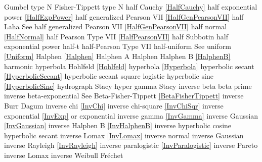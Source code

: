 Gumbel type N 					\dotfill	Fisher-Tippett type N 				\ncite	%
%
half Cauchy					\dotfill	\eqref{HalfCauchy}					\ncite	%
half exponential power			\dotfill	\eqref{HalfExpPower}				\ncite	%
half generalized Pearson VII		\dotfill	\eqref{HalfGenPearsonVII}			\ncite	%
half Laha						\dotfill	See half generalized Pearson VII \eqref{HalfGenPearsonVII}	\mcite{\self}	%
half normal 					\dotfill	\eqref{HalfNormal}					\ncite	%
half Pearson Type VII			\dotfill	\eqref{HalfPearsonVII} 				\ncite	%
half Subbotin					\dotfill	half exponential power				\ncite	%
half-t							\dotfill	half-Pearson Type VII				\ncite	%
half-uniform 					\dotfill	See uniform \eqref{Uniform} 			\ncite	%
Halphen						\dotfill	\eqref{Halphen}						\ncite
Halphen A						\dotfill	Halphen							\ncite
Halphen B						\dotfill	\eqref{HalphenB}					\ncite
harmonic						\dotfill	hyperbola							\ncite
Hohlfeld						\dotfill	\eqref{Hohlfeld}						\mcite{\self}	%
hyperbola						\dotfill	\eqref{Hyperbola}					\ncite	
hyperbolic secant 				\dotfill	\eqref{HyperbolicSecant}				\ncite	%
hyperbolic secant square			\dotfill	logistic 							\ncite	%
hyperbolic sine					\dotfill	\eqref{HyperbolicSine}				\mcite{\self}	%
hydrograph					\dotfill	Stacy 							\ncite	%
hyper gamma   					\dotfill	Stacy							\ncite	%
%
inverse beta					\dotfill	beta prime 						\ncite	%
inverse beta-exponential 			\dotfill	See Beta-Fisher-Tippett \eqref{BetaFisherTippett}\ncite
inverse Burr					\dotfill	Dagum 							\ncite	%
inverse chi  					\dotfill	\eqref{InvChi}						\ncite	%
inverse chi-square 				\dotfill	\eqref{InvChiSqr}					\ncite	%
inverse exponential 				\dotfill	\eqref{InvExp} or exponential			\ncite	%
inverse gamma 				\dotfill	\eqref{InvGamma}					\ncite	%
inverse Gaussian				\dotfill	\eqref{InvGaussian}					\ncite	%
inverse Halphen B				\dotfill	\eqref{InvHalphenB}					\ncite	
inverse hyperbolic cosine			\dotfill	hyperbolic secant 					\ncite	%
inverse Lomax					\dotfill	\eqref{InvLomax}					\ncite	%
inverse normal					\dotfill	inverse Gaussian					\ncite	%
inverse Rayleigh  				\dotfill	\eqref{InvRayleigh}					\ncite	%
inverse paralogistic				\dotfill	\eqref{InvParalogistic} 				\ncite	%
inverse Pareto					\dotfill	inverse Lomax 						\ncite 	%
inverse Weibull 				\dotfill	Fr\'{e}chet  						\ncite	%
%
